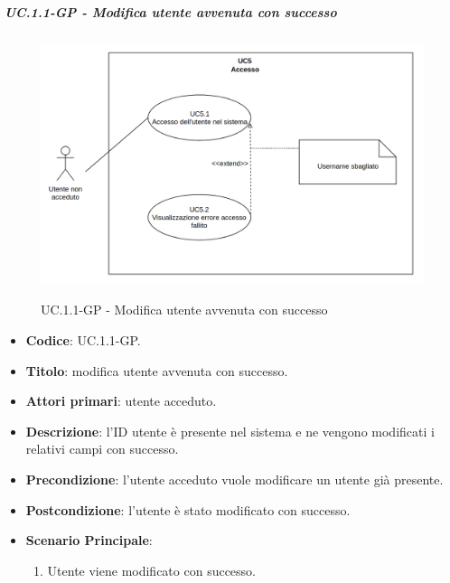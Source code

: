 		\subparagraph{UC\theuccount.1.1-GP - Modifica utente avvenuta con successo}
			\begin{figure}[H]
				\centering
				\includegraphics[width=\columnwidth]{img/UC5.png}\\
				\caption{UC\theuccount.1.1-GP - Modifica utente avvenuta con successo}
			\end{figure}
			\begin{itemize}
				\item \textbf{Codice}: UC\theuccount.1.1-GP.
				\item \textbf{Titolo}: modifica utente avvenuta con successo.
				\item \textbf{Attori primari}: utente acceduto.
				\item \textbf{Descrizione}: l'ID utente è presente nel sistema e ne vengono modificati i relativi campi con successo.
				\item \textbf{Precondizione}: l'utente acceduto vuole modificare un utente già presente.
				\item \textbf{Postcondizione}: l'utente è stato modificato con successo.
				\item \textbf{Scenario Principale}:
				\begin{enumerate}
					\item Utente viene modificato con successo.
				\end{enumerate}
			\end{itemize}
		
